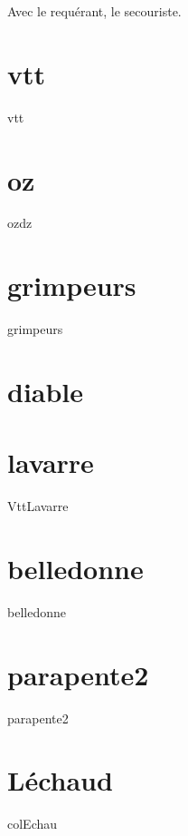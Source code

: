 \chaptertoc{}


Avec  le requérant,  le secouriste.

\section{vtt}
\label{anx:retrans_vtt}
{vtt}

\section{oz}
\label{anx:retrans_ozdz}
{ozdz}

\section{grimpeurs}
\label{anx:retrans_grimpeurs}
{grimpeurs}

\section{diable}
\label{anx:retrans_VttDiable}

\section{lavarre}
\label{anx:retrans_VttLavarre}
{VttLavarre}

\section{belledonne}
\label{anx:retrans_belledonne}
{belledonne}

\section{parapente2}
\label{anx:retrans_parapente2}
{parapente2}

\section{Léchaud}
\label{anx:retrans_colEchau}
{colEchau}
